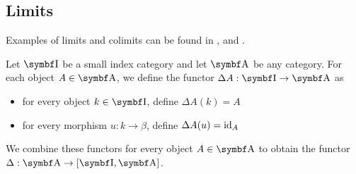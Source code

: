 \subsection{Limits}\label{subsec:categorical_limits}

\begin{remark}\label{def:categorical_limit_examples}
  Examples of limits and colimits can be found in ,  and .
\end{remark}

\begin{definition}\label{def:diagonal_functor}
  Let \( \Cat{I} \) be a small index category and let \( \Cat{A} \) be any category. For each object \( A \in \Cat{A} \), we define the functor \( \Delta A: \Cat{I} \to \Cat{A} \) as
  \begin{itemize}
    \item for every object \( k \in \Cat{I} \), define \( \Delta A(k) = A \)
    \item for every morphism \( u: k \to \beta \), define \( \Delta A(u) = \operatorname{id}_A \)
  \end{itemize}

  We combine these functors for every object \( A \in \Cat{A} \) to obtain the functor \( \Delta: \Cat{A} \to [\Cat{I}, \Cat{A}] \).
\end{definition}

